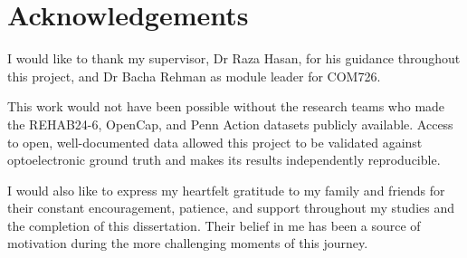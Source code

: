 \chapter*{Acknowledgements}
I would like to thank my supervisor, Dr Raza Hasan, for his guidance throughout this project, and Dr Bacha Rehman as module leader for COM726.

This work would not have been possible without the research teams who made the REHAB24-6, OpenCap, and Penn Action datasets publicly available. Access to open, well-documented data allowed this project to be validated against optoelectronic ground truth and makes its results independently reproducible.

I would also like to express my heartfelt gratitude to my family and friends for their constant encouragement, patience, and support throughout my studies and the completion of this dissertation. Their belief in me has been a source of motivation during the more challenging moments of this journey.
\clearpage
